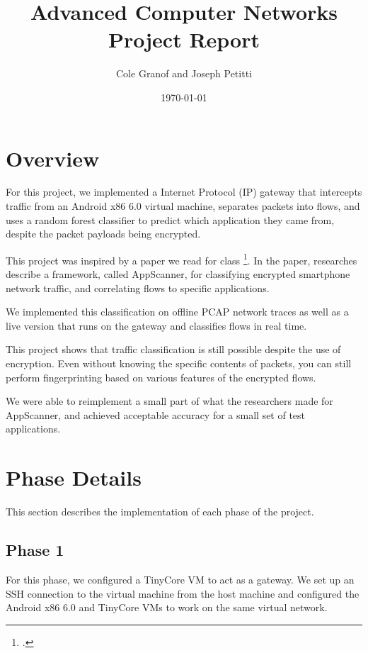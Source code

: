 \documentclass[a4paper, 11pt]{article} %
\title{Advanced Computer Networks Project Report}
\author{Cole Granof and Joseph Petitti}
\date{\today}
\begin{document}
\thispagestyle{empty}

\maketitle

\section{Overview}

For this project, we implemented a Internet Protocol (IP) gateway that
intercepts traffic from an Android x86 6.0 virtual machine, separates packets
into flows, and uses a random forest classifier to predict which application
they came from, despite the packet payloads being encrypted.

This project was inspired by a paper we read for class \footcite{tscm16}. In the
paper, researches describe a framework, called AppScanner, for classifying
encrypted smartphone network traffic, and correlating flows to specific
applications.

We implemented this classification on offline PCAP network traces as well as a
live version that runs on the gateway and classifies flows in real time.

This project shows that traffic classification is still possible despite the use
of encryption. Even without knowing the specific contents of packets, you can
still perform fingerprinting based on various features of the encrypted flows.

We were able to reimplement a small part of what the researchers made for
AppScanner, and achieved acceptable accuracy for a small set of test
applications.

\section{Phase Details}

This section describes the implementation of each phase of the project.

\subsection{Phase 1}

For this phase, we configured a TinyCore VM to act as a gateway. We set up an
SSH connection to the virtual machine from the host machine and configured the
Android x86 6.0 and TinyCore VMs to work on the same virtual network.
\end{document}
